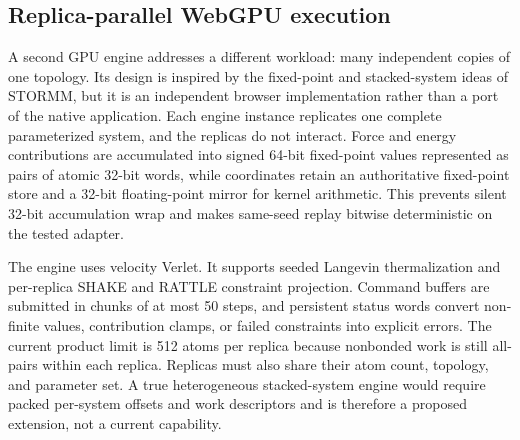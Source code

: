 \subsection{Replica-parallel WebGPU execution}
\label{app:replica-webgpu}

A second GPU engine addresses a different workload: many independent copies of
one topology.
Its design is inspired by the fixed-point and stacked-system ideas of STORMM,
but it is an independent browser implementation rather than a port of the
native application.
Each engine instance replicates one complete parameterized system, and the
replicas do not interact.
Force and energy contributions are accumulated into signed 64-bit fixed-point
values represented as pairs of atomic 32-bit words, while coordinates retain
an authoritative fixed-point store and a 32-bit floating-point mirror for
kernel arithmetic.
This prevents silent 32-bit accumulation wrap and makes same-seed replay
bitwise deterministic on the tested adapter.

The engine uses velocity Verlet.
It supports seeded Langevin thermalization and per-replica SHAKE and RATTLE
constraint projection.
Command buffers are submitted in chunks of at most 50 steps, and persistent
status words convert non-finite values, contribution clamps, or failed
constraints into explicit errors.
The current product limit is 512 atoms per replica because nonbonded work is
still all-pairs within each replica.
Replicas must also share their atom count, topology, and parameter set.
A true heterogeneous stacked-system engine would require packed per-system
offsets and work descriptors and is therefore a proposed extension, not a
current capability.

